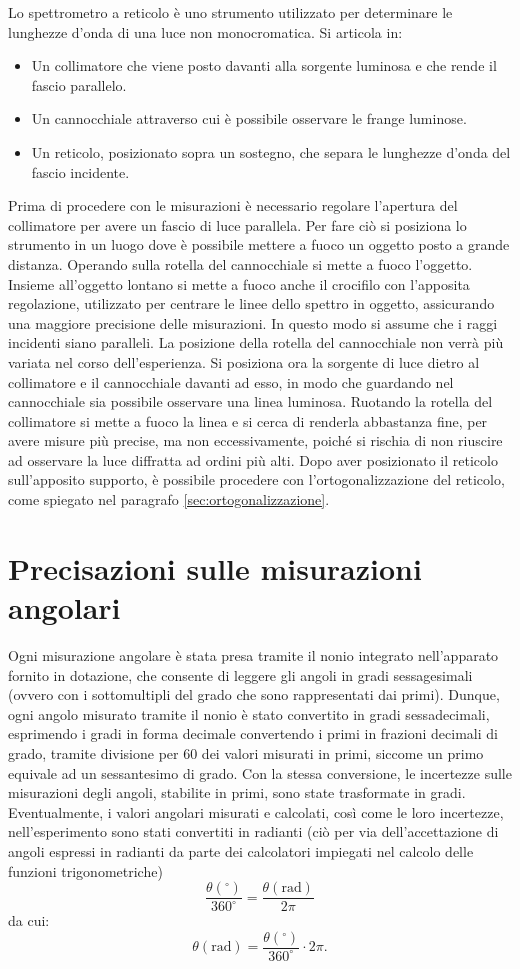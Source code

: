 \documentclass[a4paper,12pt]{article}
\begin{document}
Lo spettrometro a reticolo è uno strumento utilizzato per determinare le lunghezze d’onda di una luce non monocromatica. Si articola in: 
\begin{itemize}
    \item Un collimatore che viene posto davanti alla sorgente luminosa e che rende il fascio parallelo. 
    \item  Un cannocchiale attraverso cui è possibile osservare le frange luminose. 
    \item  Un reticolo, posizionato sopra un sostegno, che separa le lunghezze d’onda del fascio incidente. 
\end{itemize}
Prima di procedere con le misurazioni è necessario regolare l’apertura del collimatore per avere un fascio di luce parallela. Per fare ciò si posiziona lo strumento in un luogo dove è possibile mettere a fuoco un oggetto posto a grande distanza. Operando sulla rotella del cannocchiale si mette a fuoco l’oggetto. Insieme all'oggetto lontano si mette a fuoco anche il crocifilo con l'apposita regolazione, utilizzato per centrare le linee dello spettro in oggetto, assicurando una maggiore precisione delle misurazioni. In questo modo si assume che i raggi incidenti siano paralleli. La posizione della rotella del cannocchiale non verrà più variata nel corso dell’esperienza.  
Si posiziona ora la sorgente di luce dietro al collimatore e il cannocchiale davanti ad esso, in modo che guardando nel cannocchiale sia possibile osservare una linea luminosa. Ruotando la rotella del collimatore si mette a fuoco la linea e si cerca di renderla abbastanza fine, per avere misure più precise, ma non eccessivamente, poiché si rischia di non riuscire ad osservare la luce diffratta ad ordini più alti.  
Dopo aver posizionato il reticolo sull’apposito supporto, è possibile procedere con l’ortogonalizzazione del reticolo, come spiegato nel paragrafo \ref{sec:ortogonalizzazione}.
\section{Precisazioni sulle misurazioni angolari}
Ogni misurazione angolare è stata presa tramite il nonio integrato nell’apparato fornito in dotazione, che consente di leggere gli angoli in gradi sessagesimali (ovvero con i sottomultipli del grado che sono rappresentati dai primi). Dunque, ogni angolo misurato tramite il nonio è stato convertito in gradi sessadecimali, esprimendo i gradi in forma decimale convertendo i primi in frazioni decimali di grado, tramite divisione per 60 dei valori misurati in primi, siccome un primo equivale ad un sessantesimo di grado. Con la stessa conversione, le incertezze sulle misurazioni degli angoli, stabilite in primi, sono state trasformate in gradi. Eventualmente, i valori angolari misurati e calcolati, così come le loro incertezze, nell’esperimento sono stati convertiti in radianti (ciò per via dell’accettazione di angoli espressi in radianti da parte dei calcolatori impiegati nel calcolo delle funzioni trigonometriche)
\[
\frac{\theta (^\circ)}{360^\circ} = \frac{\theta (\text{rad})}{2\pi}
\]
da cui:
\[
\theta (\text{rad}) = \frac{\theta (^\circ)}{360^\circ} \cdot 2\pi.
\]
\end{document}
